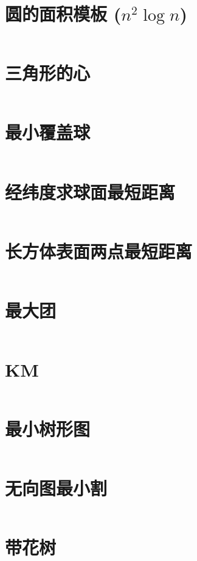 \documentclass[titlepage,landscape,a4paper,10pt]{article}
\begin{document}
\begin{multicols}{2}
\begin{spacing}{0.8}
\section{圆的面积模板 ($n^2\log n$)}
\inputminted{cpp}{merge/CircleArea.cpp}

\section{三角形的心}
\inputminted{cpp}{improve/Triangle.cpp}

\section{最小覆盖球}
\inputminted{cpp}{src/最小覆盖球.cpp}

\section{经纬度求球面最短距离}
\inputminted{cpp}{src/经纬度求球面最短距离.cpp}

\section{长方体表面两点最短距离}
\inputminted{cpp}{src/长方体表面两点最短距离.cpp}

\section{最大团}
\inputminted{cpp}{improve/MaximumClique.cpp}

\section{KM}
\inputminted{cpp}{improve/Hungarian.cpp}

\section{最小树形图}
\inputminted{cpp}{improve/LiuZhu.cpp}

\section{无向图最小割}
\inputminted{cpp}{src/无向图最小割.cpp}

\section{带花树}
\inputminted{cpp}{src/带花树.cpp}


\end{spacing}
\end{multicols}
\end{document}
